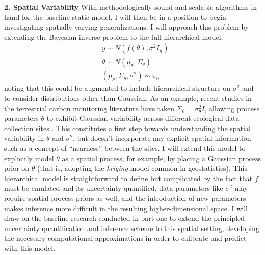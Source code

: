 \documentclass[12pt]{article}
\begin{document}
 \textbf{2. Spatial Variability} With methodologically sound and scalable algorithms in hand for the baseline static model, I will then be in a position to begin investigating spatially varying generalizations. I will approach this problem by extending the Bayesian inverse problem to the full hierarchical model,
\begin{align*}
&y \sim N(f(\theta), \sigma^2 I_n) \\
&\theta \sim N(\mu_\theta, \Sigma_\theta) \\
&(\mu_\theta, \Sigma_\theta, \sigma^2) \sim \pi_0
\end{align*}
noting that this could be augmented to include hierarchical structure on $\sigma^2$ and to consider distributions other than Gaussian. As an example, recent studies in the terrestrial 
carbon monitoring literature have taken $\Sigma_\theta = \sigma^2_\theta I$, allowing process parameters $\theta$ to exhibit Gaussian variability across different ecological data collection
sites \cite{Fer2}. This constitutes a first step towards understanding the spatial variability in $\theta$ and $\sigma^2$, but doesn't incorporate any explicit spatial information such as a concept of ``nearness'' between the sites. I will extend this model to explicitly model $\theta$ as a spatial process, for example, by placing a Gaussian process prior on $\theta$ (that is, adopting the 
\textit{kriging} model common in geostatistics). This hierarchical model is straightforward to define
 but complicated by the fact that $f$ must be emulated and its uncertainty quantified, data parameters like $\sigma^2$ may require spatial process priors as well,
and the introduction of new parameters makes inference more difficult in the resulting higher-dimensional space.  I will draw on the baseline research conducted in part one to extend the principled uncertainty quantification and inference scheme to this spatial setting, developing the necessary computational approximations in order to calibrate and predict with this model. 
 
\end{document}
